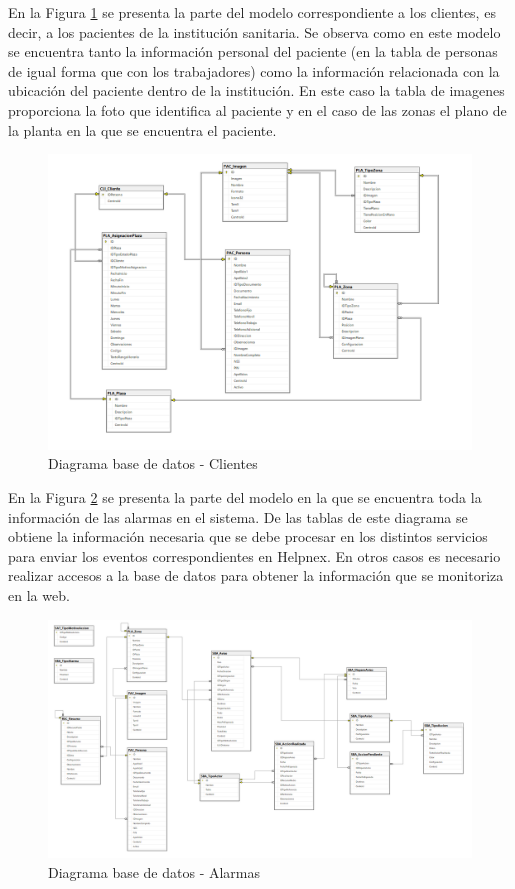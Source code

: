 \newpage
En la Figura \ref{fig:Diagrama-BD-Clientes} se presenta la parte del modelo correspondiente a los clientes, es decir, a los pacientes de la institución sanitaria. Se observa como en este modelo se encuentra tanto la información personal del paciente (en la tabla de personas de igual forma que con los trabajadores) como la información relacionada con la ubicación del paciente dentro de la institución. En este caso la tabla de imagenes proporciona la foto que identifica al paciente y en el caso de las zonas el plano de la planta en la que se encuentra el paciente.

\begin{figure}[H]
    \centering
    \includegraphics[width=16cm]{Imagenes/Diagrama-BD-Clientes}
    \caption{Diagrama base de datos - Clientes}
    \label{fig:Diagrama-BD-Clientes}
\end{figure}

\newpage
En la Figura \ref{fig:Diagrama-BD-Alertas} se presenta la parte del modelo en la que se encuentra toda la información de las alarmas en el sistema. De las tablas de este diagrama se obtiene la información necesaria que se debe procesar en los distintos servicios para enviar los eventos correspondientes en Helpnex. En otros casos es necesario realizar accesos a la base de datos para obtener la información que se monitoriza en la web.

\begin{figure}[H]
    \centering
    \includegraphics[width=16cm]{Imagenes/Diagrama-BD-Alertas}
    \caption{Diagrama base de datos - Alarmas}
    \label{fig:Diagrama-BD-Alertas}
\end{figure}

